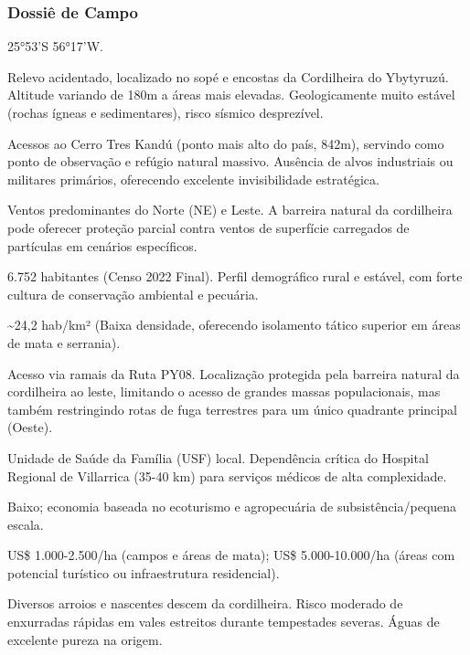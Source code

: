 \subsubsection{Dossiê de Campo}
\begin{description}[style=nextline,leftmargin=0.5cm,font=\bfseries]
\item[Coordenadas]  25°53'S 56°17'W.
\item[Topografia]  Relevo acidentado, localizado no sopé e encostas da Cordilheira do Ybytyruzú. Altitude variando de 180m a áreas mais elevadas. Geologicamente muito estável (rochas ígneas e sedimentares), risco sísmico desprezível.
\item[Alvos Estratégicos]  Acessos ao Cerro Tres Kandú (ponto mais alto do país, 842m), servindo como ponto de observação e refúgio natural massivo. Ausência de alvos industriais ou militares primários, oferecendo excelente invisibilidade estratégica.
\item[Fallout]  Ventos predominantes do Norte (NE) e Leste. A barreira natural da cordilheira pode oferecer proteção parcial contra ventos de superfície carregados de partículas em cenários específicos.
\item[População]  6.752 habitantes (Censo 2022 Final). Perfil demográfico rural e estável, com forte cultura de conservação ambiental e pecuária.
\item[Densidade]  \textasciitilde 24,2 hab/\allowbreak km² (Baixa densidade, oferecendo isolamento tático superior em áreas de mata e serrania).
\item[Vias de Acesso]  Acesso via ramais da Ruta PY08. Localização protegida pela barreira natural da cordilheira ao leste, limitando o acesso de grandes massas populacionais, mas também restringindo rotas de fuga terrestres para um único quadrante principal (Oeste).
\item[Serviços]  Unidade de Saúde da Família (USF) local. Dependência crítica do Hospital Regional de Villarrica (35-40 km) para serviços médicos de alta complexidade.
\item[Custo de Vida]  Baixo; economia baseada no ecoturismo e agropecuária de subsistência/\allowbreak pequena escala.
\item[Preço da Terra]  US\$ 1.000-2.500/\allowbreak ha (campos e áreas de mata); US\$ 5.000-10.000/\allowbreak ha (áreas com potencial turístico ou infraestrutura residencial).
\item[Hidrologia]  Diversos arroios e nascentes descem da cordilheira. Risco moderado de enxurradas rápidas em vales estreitos durante tempestades severas. Águas de excelente pureza na origem.

\end{description}

